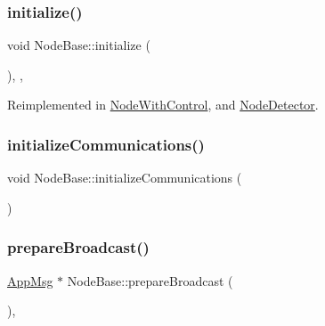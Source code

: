 \subsubsection{\texorpdfstring{initialize()}{initialize()}}
{\footnotesize\ttfamily void Node\+Base\+::initialize (\begin{DoxyParamCaption}{ }\end{DoxyParamCaption})\hspace{0.3cm}{\ttfamily [override]}, {\ttfamily [protected]}, {\ttfamily [virtual]}}



Reimplemented in \hyperlink{classNodeWithControl_a08c8e80fd67b52c51c642d7c66fe729c}{Node\+With\+Control}, and \hyperlink{classNodeDetector_aefa188ab0657837b1b57f24674d3ef22}{Node\+Detector}.

\mbox{\label{classNodeBase_a2077b2a599f55050603268dbf8fff6a7}} 
\subsubsection{\texorpdfstring{initialize\+Communications()}{initializeCommunications()}}
{\footnotesize\ttfamily void Node\+Base\+::initialize\+Communications (\begin{DoxyParamCaption}{ }\end{DoxyParamCaption})\hspace{0.3cm}{\ttfamily [protected]}}

\mbox{\label{classNodeBase_a66c1dee9d15119bc3e68da71067ff6cd}} 
\subsubsection{\texorpdfstring{prepare\+Broadcast()}{prepareBroadcast()}}
{\footnotesize\ttfamily \hyperlink{classAppMsg}{App\+Msg} $\ast$ Node\+Base\+::prepare\+Broadcast (\begin{DoxyParamCaption}{ }\end{DoxyParamCaption})\hspace{0.3cm}{\ttfamily [protected]}, {\ttfamily [virtual]}}



